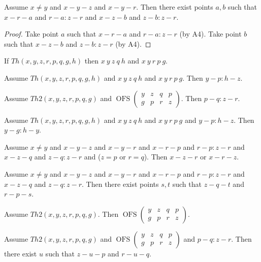 \documentclass{article}
\newcommand{\OFS}[8]{\operatorname{OFS}
\left(\begin{smallmatrix}%
#1 & #2 & #3 & #4 \\
#5 & #6 & #7 & #8
\end{smallmatrix}\right)%
}
\begin{document}
  \begin{forthel}
    \begin{lemma}[C5o1f]
      Assume $x \neq y$ and $x-y-z$ and $x-y-r$. Then there exist points $a,b$ such that $x-r-a$ and $r-a : z-r$ and $x-z-b$ and $z-b : z-r$.
    \end{lemma}
    \begin{proof}
    	Take point $a$ such that $x-r-a$ and $r-a : z-r$ (by A4).	Take point $b$ such that $x-z-b$ and $z-b : z-r$ (by A4).
    \end{proof}

    \begin{axiom}[C5o1g]
      If $Th(x,y,z,r,p,q,g,h)$ then $x~y~z~q~h$ and $x~y~r~p~g$.
    \end{axiom}

    \begin{axiom}[C5o1h]
      Assume $Th(x,y,z,r,p,q,g,h)$ and $x~y~z~q~h$ and $x~y~r~p~g$. Then $y-p : h-z$.
    \end{axiom}

    \begin{axiom}[C5o1i]
      Assume $Th2(x,y,z,r,p,q,g)$ and $\OFS{y}{z}{q}{p}{g}{p}{r}{z}$. Then $p-q : z-r$.
    \end{axiom}

    \begin{axiom}[C5o1j]
      Assume $Th(x,y,z,r,p,q,g,h)$ and $x~y~z~q~h$ and $x~y~r~p~g$ and $y-p : h-z$. Then $y-g : h-y$.
    \end{axiom}



    \begin{lemma}[C5o1k]
      Assume $x \neq y$ and $x-y-z$ and $x-y-r$ and $x-r-p$ and $r-p : z-r$ and $x-z-q$ and $z-q : z-r$ and ($z = p$ or $r = q$). Then $x-z-r$ or $x-r-z$.
    \end{lemma}

    \begin{lemma}[C5o1l]
      Assume $x \neq y$ and $x-y-z$ and $x-y-r$ and $x-r-p$ and $r-p : z-r$ and $x-z-q$ and $z-q : z-r$. Then there exist points $s,t$ such that $z-q-t$ and $r-p-s$.
    \end{lemma}

    \begin{lemma}[C5o1m]
      Assume $Th2(x,y,z,r,p,q,g)$. Then $\OFS{y}{z}{q}{p}{g}{p}{r}{z}$.
    \end{lemma}

    \begin{lemma}[C5o1n]
      Assume $Th2(x,y,z,r,p,q,g)$ and $\OFS{y}{z}{q}{p}{g}{p}{r}{z}$ and $p-q : z-r$. Then there exist $u$ such that $z-u-p$ and $r-u-q$.
    \end{lemma}


\end{forthel}
\end{document}
